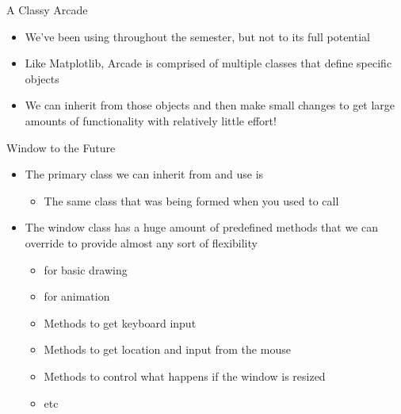 \documentclass[pdf, aspectratio=169, 12pt]{beamer}
\begin{document}
\begin{frame}{A Classy Arcade}
	\begin{itemize}
		\item We've been using  throughout the semester, but not to its full potential
		\item Like Matplotlib, Arcade is comprised of multiple classes that define specific objects
		\item We can inherit from those objects and then make small changes to get large amounts of functionality with relatively little effort!
	\end{itemize}
\end{frame}

\begin{frame}{Window to the Future}
	\begin{itemize}
		\item The primary class we can inherit from and use is 
			\begin{itemize}
				\item The same class that was being formed when you used to call 
			\end{itemize}
		\item The window class has a huge amount of predefined methods that we can override to provide almost any sort of flexibility
			\begin{itemize}
				\item {} for basic drawing
				\item {} for animation
				\item Methods to get keyboard input
				\item Methods to get location and input from the mouse
				\item Methods to control what happens if the window is resized
				\item etc
			\end{itemize}
	\end{itemize}
\end{frame}
\end{document}
